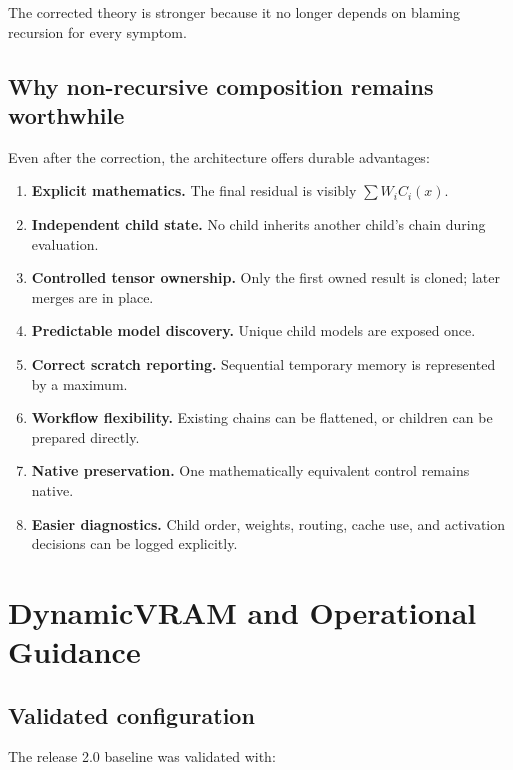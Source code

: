 \documentclass[11pt]{article}
\begin{document}
The corrected theory is stronger because it no longer depends on blaming recursion for every symptom.

\subsection{Why non-recursive composition remains worthwhile}

Even after the correction, the architecture offers durable advantages:

\begin{enumerate}
  \item \textbf{Explicit mathematics.} The final residual is visibly $\sum W_iC_i(x)$.
  \item \textbf{Independent child state.} No child inherits another child’s chain during evaluation.
  \item \textbf{Controlled tensor ownership.} Only the first owned result is cloned; later merges are in place.
  \item \textbf{Predictable model discovery.} Unique child models are exposed once.
  \item \textbf{Correct scratch reporting.} Sequential temporary memory is represented by a maximum.
  \item \textbf{Workflow flexibility.} Existing chains can be flattened, or children can be prepared directly.
  \item \textbf{Native preservation.} One mathematically equivalent control remains native.
  \item \textbf{Easier diagnostics.} Child order, weights, routing, cache use, and activation decisions can be logged explicitly.
\end{enumerate}

\section{DynamicVRAM and Operational Guidance}

\subsection{Validated configuration}

The release 2.0 baseline was validated with:
\end{document}
